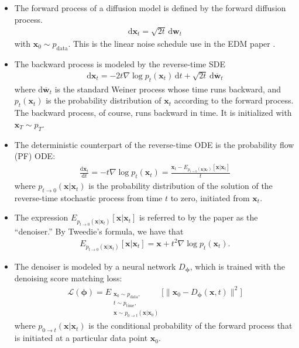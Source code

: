 \documentclass[10pt]{article}
\newcommand{\dee}{\mathrm{d}}
\newcommand{\ve}[1]{\mathbf{#1}}
\newcommand{\ves}[1]{\boldsymbol{#1}}
\newcommand{\mrm}[1]{\mathrm{#1}}
\newcommand{\mcal}[1]{\mathcal{#1}}
\newcommand{\data}{\mathrm{data}}
\begin{document}
\begin{itemize}
  \item The forward process of a diffusion model is defined by the forward diffusion process.
  \begin{align*}
    \dee \ve{x}_t = \sqrt{2t}\, \dee\ve{w}_t
  \end{align*}
  with $\ve{x}_0 \sim p_{\data}$. This is the linear noise schedule use in the EDM paper \cite{Karras:2022}.

  \item The backward process is modeled by the reverse-time SDE \cite{Anderson:1982}
  \begin{align*}
    \dee \ve{x}_t = - 2t \nabla \log p_t(\ve{x}_t)\, \dee t + \sqrt{2t}\, \dee \overline{\ve{w}}_t
  \end{align*}
  where $\dee \overline{\ve{w}}_t$ is the standard Weiner process whose time runs backward, and $p_t(\ve{x}_t)$ is the probability distribution of $\ve{x}_t$ according to the forward process. The backward process, of course, runs backward in time. It is initialized with $\ve{x}_T \sim p_T$.

  \item The deterministic counterpart of the reverse-time ODE is the probability flow (PF) ODE:
  \begin{align*}
    \frac{\dee \ve{x}_t}{\dee t} = -t \nabla \log p_t(\ve{x}_t) = \frac{\ve{x}_t - E_{p_{t \rightarrow 0}(\ve{x}|\ve{x}_t)}[\ve{x}|\ve{x}_t]}{t}
  \end{align*}
  where $p_{t \rightarrow 0}(\ve{x}|\ve{x}_t)$ is the probability distribution of the solution of the reverse-time stochastic process from time $t$ to zero, initiated from $\ve{x}_t$. 
  
  \item The expression $E_{p_{t \rightarrow 0}(\ve{x}|\ve{x}_t)}[\ve{x}|\ve{x}_t]$ is referred to by the paper as the ``denoiser.'' By Tweedie's formula, we have that
  \begin{align*}
    E_{p_{t \rightarrow 0}(\ve{x}|\ve{x}_t)}[\ve{x}|\ve{x}_t] = \ve{x} + t^2 \nabla \log p_t(\ve{x}_t).
  \end{align*}
  
  \item The denoiser is modeled by a neural network $D_{\ves{\phi}}$, which is trained with the denoising score matching loss:
  \begin{align*}
    \mcal{L}(\ves{\phi}) = E_{\substack{\ve{x}_0 \sim p_{\data}, \\ t \sim p_{\mrm{time}}, \\ \ve{x} \sim p_{0 \rightarrow t}(\ve{x}|\ve{x}_0)  }} \Big[ \| \ve{x}_0 - D_{\ves{\phi}}(\ve{x}, t) \|^2 \Big]
  \end{align*}
  where $p_{0 \rightarrow t}(\ve{x}|\ve{x}_t)$ is the conditional probability of the forward process that is initiated at a particular data point $\ve{x}_0$.


\end{itemize}
\end{document}
